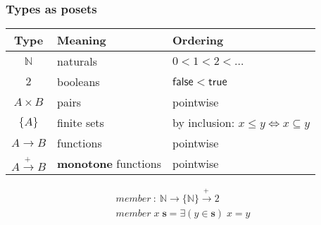 \documentclass{beamer}
\newcommand{\mto}{\overset{+\:}{\to}}
\newcommand{\ms}{\mathsf}
\begin{document}
\begin{frame}
  \frametitle{Types as posets}
  \begin{center}
    \begin{tabular}{cll}
      \textbf{Type} & \textbf{Meaning} & \textbf{Ordering}
      \\\hline
      $\mathbb{N}$ & naturals & $0 < 1 < 2 < \hdots$\\
      $2$ & booleans & $\ms{false} < \ms{true}$\\
      $A \times B$ & pairs & pointwise\\
      $\{A\}$      & finite sets & by inclusion: $x \le y \iff x \subseteq y$\\
      $A \to B$    & functions & pointwise\\
      $A \mto B$  & \textbf{monotone} functions & pointwise\\
    \end{tabular}
  \end{center}

  \vspace{0.75em}\pause

  \[\begin{array}{l}
    member ~:~ \mathbb{N} \to \{\mathbb{N}\} \mto 2\\
    member\; x\; \mathbf{s} = \exists(y \in \mathbf{s})\; x = y
  \end{array}\]

  \vspace{5em}

\end{frame}
\end{document}
